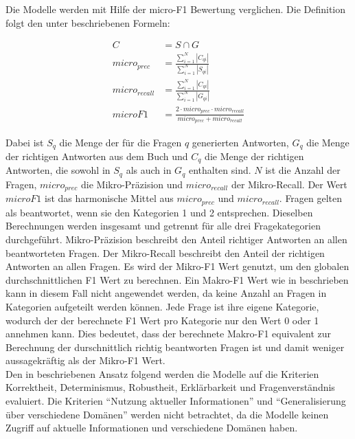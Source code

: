 Die Modelle werden mit Hilfe der micro-F1 Bewertung verglichen.
Die Definition folgt den unter \citet{chatgpt_qas} beschriebenen Formeln:
\begin{ceqn}
\begin{align}
    C &= S \cap G \\
    micro_{prec} &= \frac{\sum_{i=1}^{N}|C_{qi}|}{\sum_{i=1}^{N}|S_{qi}|} \\
    micro_{recall} &= \frac{\sum_{i=1}^{N}|C_{qi}|}{\sum_{i=1}^{N}|G_{qi}|} \\
    microF1 &= \frac{2 \cdot micro_{prec} \cdot micro_{recall}}{micro_{prec} + micro_{recall}}
\end{align}
\end{ceqn}
Dabei ist $S_q$ die Menge der für die Fragen $q$ generierten Antworten, $G_q$ die Menge der richtigen Antworten aus dem Buch \citet{bb} und $C_q$ die Menge der richtigen Antworten, die sowohl in $S_q$ als auch in $G_q$ enthalten sind.
$N$ ist die Anzahl der Fragen, $micro_{prec}$ die Mikro-Präzision und $micro_{recall}$ der Mikro-Recall.
Der Wert $microF1$ ist das harmonische Mittel aus $micro_{prec}$ und $micro_{recall}$.
Fragen gelten als beantwortet, wenn sie den Kategorien 1 und 2 entsprechen.
Dieselben Berechnungen werden insgesamt und getrennt für alle drei Fragekategorien durchgeführt.
Mikro-Präzision beschreibt den Anteil richtiger Antworten an allen beantworteten Fragen.
Der Mikro-Recall beschreibt den Anteil der richtigen Antworten an allen Fragen.
Es wird der Mikro-F1 Wert genutzt, um den globalen durchschnittlichen F1 Wert zu berechnen.
Ein Makro-F1 Wert wie in \citet{qald9} beschrieben kann in diesem Fall nicht angewendet werden, da keine Anzahl an Fragen in Kategorien aufgeteilt werden können. Jede Frage ist ihre eigene Kategorie, wodurch der der berechnete F1 Wert pro Kategorie nur den Wert 0 oder 1 annehmen kann. Dies bedeutet, dass der berechnete Makro-F1 equivalent zur Berechnung der durschnittlich richtig beantworten Fragen ist und damit weniger aussagekräftig als der Mikro-F1 Wert.\\

Den in \citet{chatgpt_qas} beschriebenen Ansatz folgend werden die Modelle auf die Kriterien Korrektheit, Determinismus, Robustheit, Erklärbarkeit und Fragenverständnis evaluiert.
Die Kriterien \enquote{Nutzung aktueller Informationen} und \enquote{Generalisierung über verschiedene Domänen} werden nicht betrachtet, da die Modelle keinen Zugriff auf aktuelle Informationen und verschiedene Domänen haben.\\

